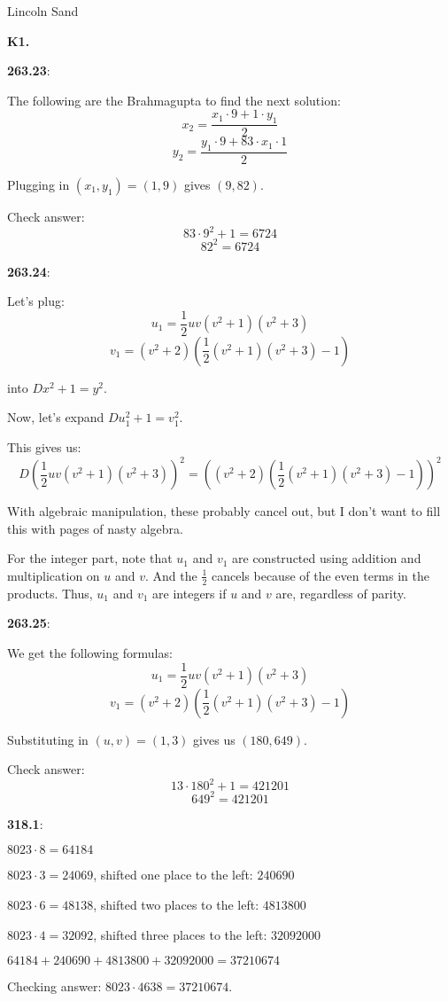 \documentclass{article}
\begin{document}
\Large{Lincoln Sand}


\textbf{K1.}

\textbf{263.23}:

The following are the Brahmagupta to find the next solution:
\[x_2 = \frac{x_1 \cdot 9 + 1 \cdot y_1}{2}\]
\[y_2 = \frac{y_1 \cdot 9 + 83 \cdot x_1 \cdot 1}{2}\]

Plugging in $(x_1, y_1) = (1, 9)$ gives $(9, 82)$.

Check answer:
\[83 \cdot 9^2 + 1 = 6724\]
\[82^2 = 6724\]


\textbf{263.24}:

Let's plug:
\[u_1 = \frac{1}{2} uv(v^2 + 1)(v^2 + 3)\]
\[v_1 = (v^2 + 2)\left(\frac{1}{2}(v^2 + 1)(v^2 + 3) - 1\right)\]

into $Dx^2 + 1 = y^2$.

Now, let's expand $D u_1^2 + 1 = v_1^2$.

This gives us:
\[D\left(\frac{1}{2} uv(v^2+1)(v^2+3)\right)^2 = \left(\left(v^2+2\right)\left(\frac{1}{2}(v^2+1)(v^2+3)-1\right)\right)^2\]

With algebraic manipulation, these probably cancel out, but I don't want to
fill this with pages of nasty algebra.

For the integer part, note that $u_1$ and $v_1$ are constructed using addition
and multiplication on $u$ and $v$. And the $\frac{1}{2}$ cancels because of the
even terms in the products. Thus, $u_1$ and $v_1$ are integers if $u$ and $v$
are, regardless of parity.


\textbf{263.25}:

We get the following formulas:
\[u_1 = \frac{1}{2} uv(v^2 + 1)(v^2 + 3)\]
\[v_1 = (v^2 + 2)\left(\frac{1}{2}(v^2 + 1)(v^2 + 3) - 1\right)\]

Substituting in $(u, v) = (1, 3)$ gives us $(180, 649)$.

Check answer:
\[13 \cdot 180^2 + 1 = 421201\]
\[649^2 = 421201\]


\textbf{318.1}:

$8023 \cdot 8 = 64184$

$8023 \cdot 3 = 24069$, shifted one place to the left: $240690$

$8023 \cdot 6 = 48138$, shifted two places to the left: $4813800$

$8023 \cdot 4 = 32092$, shifted three places to the left: $32092000$

$64184 + 240690 + 4813800 + 32092000 = 37210674$

Checking answer: $8023 \cdot 4638 = 37210674$.
\end{document}

